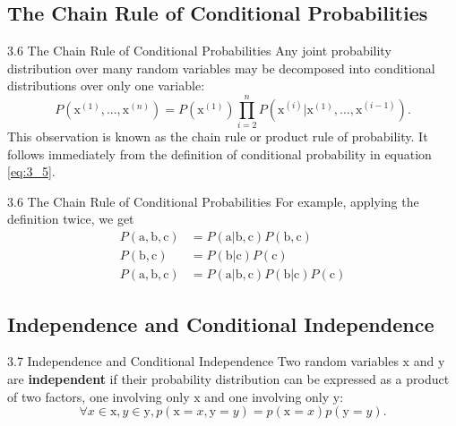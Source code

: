 \subsection{The Chain Rule of Conditional Probabilities}
\begin{frame}{3.6 The Chain Rule of Conditional Probabilities}
    \justifying
    Any joint probability distribution over many random variables may be decomposed into conditional distributions over only one variable:
    \begin{equation}
        P(\mathrm{x}^{(1)}, ..., \mathrm{x}^{(n)}) = P(\mathrm{x}^{(1)})\prod^{n}_{i = 2} P(\mathrm{x}^{(i)} | \mathrm{x}^{(1)}, ..., \mathrm{x}^{(i-1)}).
        \label{eq:3_6}
    \end{equation}
    This observation is known as the chain rule or product rule of probability. It follows immediately from the definition of conditional probability in equation \ref{eq:3_5}.
\end{frame}

\begin{frame}{3.6 The Chain Rule of Conditional Probabilities}
    For example, applying the definition twice, we get
    \begin{align}
        P(\mathrm{a}, \mathrm{b}, \mathrm{c}) &= P(\mathrm{a} | \mathrm{b}, \mathrm{c}) P(\mathrm{b}, \mathrm{c}) \nonumber\\
        P(\mathrm{b}, \mathrm{c}) &= P(\mathrm{b} | \mathrm{c}) P(\mathrm{c}) \nonumber\\
        P(\mathrm{a}, \mathrm{b}, \mathrm{c}) &= P(\mathrm{a} | \mathrm{b}, \mathrm{c}) P(\mathrm{b} | \mathrm{c}) P(\mathrm{c}) \nonumber
    \end{align}
\end{frame}

\subsection{Independence and Conditional Independence}
\begin{frame}{3.7 Independence and Conditional Independence}
    \justifying
    Two random variables $\mathrm{x}$ and $\mathrm{y}$ are \textbf{independent} if their probability distribution can be expressed as a product of two factors, one involving only $\mathrm{x}$ and one involving only $\mathrm{y}$:
    \begin{equation}
        \forall x \in \mathrm{x}, y \in \mathrm{y}, p(\mathrm{x} = x, \mathrm{y} = y) = p(\mathrm{x} = x) p(\mathrm{y} = y).
        \label{eq:3_7}
    \end{equation}
\end{frame}

